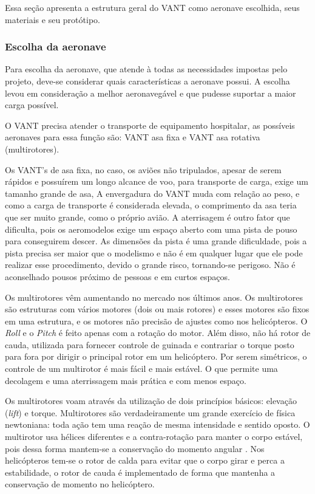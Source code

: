 Essa seção apresenta a estrutura geral do VANT como aeronave escolhida, seus materiais e seu protótipo.
\subsubsection{Escolha da aeronave}

Para escolha da aeronave, que atende à todas as necessidades impostas pelo projeto, deve-se considerar quais características a aeronave possui.
A escolha levou em consideração a melhor aeronavegável e que pudesse suportar a maior carga possível.

O VANT precisa atender o transporte de equipamento hospitalar, as possíveis aeronaves para essa função são: VANT asa fixa e VANT asa 
rotativa (multirotores).

Os VANT’s de asa fixa, no caso, os aviões não tripulados, apesar de serem rápidos e possuírem um longo alcance de voo, para transporte de carga,
exige um tamanho grande de asa, A envergadura do VANT muda com relação ao peso, e como a carga de transporte é considerada elevada, o 
comprimento da asa teria que ser muito grande, como o próprio avião. A aterrisagem é outro fator que dificulta, pois os aeromodelos 
exige um espaço aberto com uma pista de pouso para conseguirem descer. As dimensões da pista é uma grande dificuldade, pois a pista
precisa ser maior que o modelismo e não é em qualquer lugar que ele pode realizar esse procedimento, devido o grande risco,
tornando-se perigoso. Não é aconselhado pousos próximo de pessoas e em curtos espaços.

Os multirotores vêm aumentando no mercado nos últimos anos. Os multirotores são estruturas com vários motores (dois ou mais rotores) e 
esses motores são fixos em uma estrutura, e os motores não precisão de ajustes como nos helicópteros. O \textit{Roll} e o \textit{Pitch} é feito 
apenas com a rotação do motor. Além disso, não há rotor de cauda, utilizada para fornecer controle de guinada e contrariar o torque posto 
para fora por dirigir o principal rotor em um helicóptero. Por serem simétricos, o controle de um multirotor é mais fácil e mais estável. O
que permite uma decolagem e uma aterrissagem mais prática e com menos espaço.

Os multirotores voam através da utilização de dois princípios básicos: elevação (\textit{lift}) e torque. Multirotores são verdadeiramente
um grande exercício de física newtoniana: toda ação tem uma reação de mesma intensidade e sentido oposto. O multirotor usa  hélices 
diferentes e a contra-rotação para  manter o corpo  estável, pois dessa forma mantem-se a conservação do momento angular \cite{audronis}. 
Nos helicópteros tem-se o rotor de calda para evitar que o corpo girar e perca a estabilidade, o rotor de cauda é implementado de forma que 
mantenha a conservação de momento no helicóptero. 

